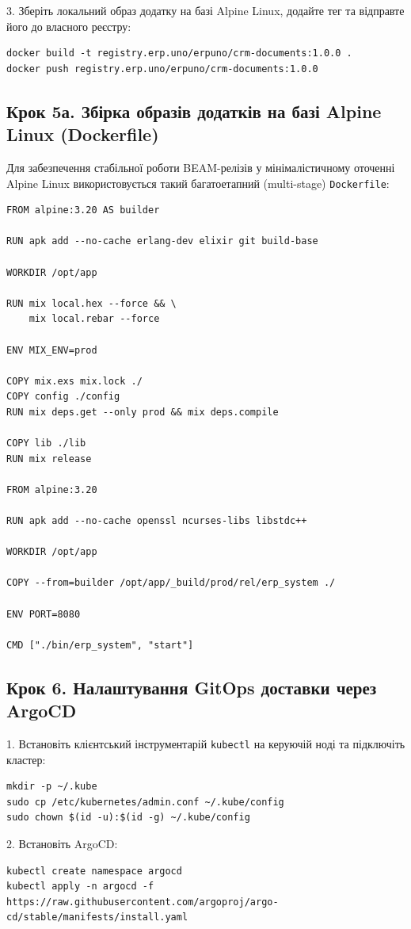 3. Зберіть локальний образ додатку на базі Alpine Linux, додайте тег та відправте його до власного реєстру:
\begin{lstlisting}
docker build -t registry.erp.uno/erpuno/crm-documents:1.0.0 .
docker push registry.erp.uno/erpuno/crm-documents:1.0.0
\end{lstlisting}

\subsection{Крок 5а. Збірка образів додатків на базі Alpine Linux (Dockerfile)}
Для забезпечення стабільної роботи BEAM-релізів у мінімалістичному оточенні Alpine Linux використовується такий багатоетапний (multi-stage) \texttt{Dockerfile}:

\begin{lstlisting}
FROM alpine:3.20 AS builder

RUN apk add --no-cache erlang-dev elixir git build-base

WORKDIR /opt/app

RUN mix local.hex --force && \
    mix local.rebar --force

ENV MIX_ENV=prod

COPY mix.exs mix.lock ./
COPY config ./config
RUN mix deps.get --only prod && mix deps.compile

COPY lib ./lib
RUN mix release

FROM alpine:3.20

RUN apk add --no-cache openssl ncurses-libs libstdc++

WORKDIR /opt/app

COPY --from=builder /opt/app/_build/prod/rel/erp_system ./

ENV PORT=8080

CMD ["./bin/erp_system", "start"]
\end{lstlisting}

\subsection{Крок 6. Налаштування GitOps доставки через ArgoCD}
1. Встановіть клієнтський інструментарій \texttt{kubectl} на керуючій ноді та підключіть кластер:
\begin{lstlisting}
mkdir -p ~/.kube
sudo cp /etc/kubernetes/admin.conf ~/.kube/config
sudo chown $(id -u):$(id -g) ~/.kube/config
\end{lstlisting}

2. Встановіть ArgoCD:
\begin{lstlisting}
kubectl create namespace argocd
kubectl apply -n argocd -f https://raw.githubusercontent.com/argoproj/argo-cd/stable/manifests/install.yaml
\end{lstlisting}

